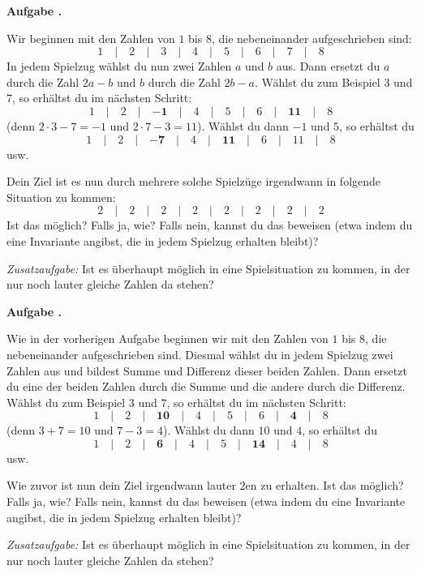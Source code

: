 \documentclass[a4paper,ngerman,12pt]{scrartcl}
\theoremstyle{definition}
\theoremstyle{plain}
\theoremstyle{remark}
\newlength{\aufgabenskip}
\newcounter{aufgabennummer}
\newenvironment{aufgabe}[1]{
	\addtocounter{aufgabennummer}{1}
	\textbf{Aufgabe \theaufgabennummer.} \emph{#1} \par
}{\vspace{\aufgabenskip}}
\begin{document}
\begin{aufgabe}{}
	Wir beginnen mit den Zahlen von $1$ bis $8$, die nebeneinander aufgeschrieben sind:
	\[1 \quad\vert\quad 2 \quad\vert\quad 3 \quad\vert\quad 4 \quad\vert\quad 5 \quad\vert\quad 6 \quad\vert\quad 7 \quad\vert\quad 8\]
	In jedem Spielzug wählst du nun zwei Zahlen $a$ und $b$ aus. Dann ersetzt du $a$ durch die Zahl $2a-b$ und $b$ durch die Zahl $2b-a$. Wählst du zum Beispiel $3$ und $7$, so erhältst du im nächsten Schritt:
	\[1 \quad\vert\quad 2 \quad\vert\quad \mathbf{-1} \quad\vert\quad 4 \quad\vert\quad 5 \quad\vert\quad 6 \quad\vert\quad \mathbf{11} \quad\vert\quad 8\]
	(denn $2\cdot 3-7=-1$ und $2\cdot 7-3=11$). Wählst du dann $-1$ und $5$, so erhältst du
	\[1 \quad\vert\quad 2 \quad\vert\quad \mathbf{-7} \quad\vert\quad 4 \quad\vert\quad \mathbf{11} \quad\vert\quad 6 \quad\vert\quad 11 \quad\vert\quad 8\]
	usw.
	
	Dein Ziel ist es nun durch mehrere solche Spielzüge irgendwann in folgende Situation zu kommen:
	\[2 \quad\vert\quad 2 \quad\vert\quad 2 \quad\vert\quad 2 \quad\vert\quad 2 \quad\vert\quad 2 \quad\vert\quad 2 \quad\vert\quad 2\]		
	Ist das möglich? Falls ja, wie? Falls nein, kannst du das beweisen (etwa indem du eine Invariante angibst, die in jedem Spielzug erhalten bleibt)?
	
	\emph{Zusatzaufgabe:} Ist es überhaupt möglich in eine Spielsituation zu kommen, in der nur noch lauter gleiche Zahlen da stehen?
\end{aufgabe}

\begin{aufgabe}{}
	Wie in der vorherigen Aufgabe beginnen wir mit den Zahlen von $1$ bis $8$, die nebeneinander aufgeschrieben sind. Diesmal wählst du in jedem Spielzug zwei Zahlen aus und bildest Summe und Differenz dieser beiden Zahlen. Dann ersetzt du eine der beiden Zahlen durch die Summe und die andere durch die Differenz. Wählst du zum Beispiel $3$ und $7$, so erhältst du im nächsten Schritt:
		\[1 \quad\vert\quad 2 \quad\vert\quad \mathbf{10} \quad\vert\quad 4 \quad\vert\quad 5 \quad\vert\quad 6 \quad\vert\quad \mathbf{4} \quad\vert\quad 8\]
	(denn $3+7=10$ und $7-3=4$). Wählst du dann $10$ und $4$, so erhältst du
		\[1 \quad\vert\quad 2 \quad\vert\quad \mathbf{6} \quad\vert\quad 4 \quad\vert\quad 5 \quad\vert\quad \mathbf{14} \quad\vert\quad 4 \quad\vert\quad 8\]
	usw.
	
	Wie zuvor ist nun dein Ziel irgendwann lauter $2$en zu erhalten. Ist das möglich? Falls ja, wie? Falls nein, kannst du das beweisen (etwa indem du eine Invariante angibst, die in jedem Spielzug erhalten bleibt)?
	
	\emph{Zusatzaufgabe:} Ist es überhaupt möglich in eine Spielsituation zu kommen, in der nur noch lauter gleiche Zahlen da stehen?
\end{aufgabe}
\end{document}
